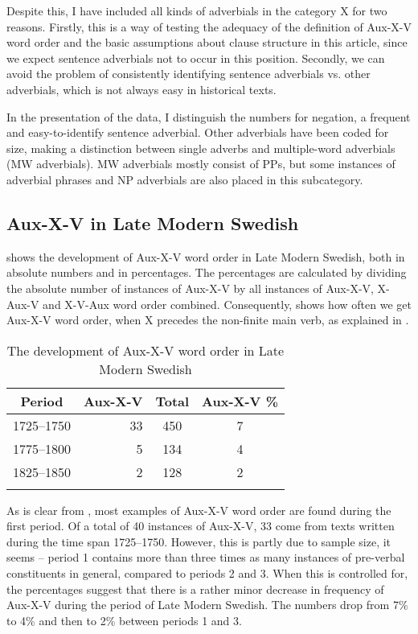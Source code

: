 \documentclass[output=paper, colorlinks, citecolor=brown]{langscibook}
\begin{document}
Despite this, I have included all kinds of adverbials in the category X for two reasons. Firstly, this is a way of testing the adequacy of the definition of Aux-X-V word order and the basic assumptions about clause structure in this article, since we expect sentence adverbials not to occur in this position. Secondly, we can avoid the problem of consistently identifying sentence adverbials vs. other adverbials, which is not always easy in historical texts.



In the presentation of the data, I distinguish the numbers for negation, a frequent and easy-to-identify sentence adverbial. Other adverbials have been coded for size, making a distinction between single adverbs and multiple-word adverbials (MW adverbials). MW adverbials mostly consist of PPs, but some instances of adverbial phrases and NP adverbials are also placed in this subcategory.


\subsection{Aux-X-V in Late Modern Swedish}\label{sec:sangfelt:4.2}

 shows the development of Aux-X-V word order in Late Modern Swedish, both in absolute numbers and in percentages. The percentages are calculated by dividing the absolute number of instances of Aux-X-V by all instances of Aux-X-V, X-Aux-V and X-V-Aux word order combined. Consequently,  shows how often we get Aux-X-V word order, when X precedes the non-finite main verb, as explained in .



\begin{table}
\caption{The development of Aux-X-V word order in Late Modern Swedish\label{tab:sangfelt:1}}
\begin{tabular}{crcc}
\lsptoprule
Period & {Aux-X-V} & Total & {Aux-X-V} \%\\
\midrule
1725–1750 & 33 & 450 & 7\\
1775–1800 & 5 & 134 & 4\\
1825–1850 & 2 & 128 & 2\\
\lspbottomrule
\end{tabular}
\end{table}

As is clear from , most examples of Aux-X-V word order are found during the first period. Of a total of 40 instances of Aux-X-V, 33 come from texts written during the time span 1725–1750. However, this is partly due to sample size, it seems – period 1 contains more than three times as many instances of pre-verbal constituents in general, compared to periods 2 and 3. When this is controlled for, the percentages suggest that there is a rather minor decrease in frequency of Aux-X-V during the period of Late Modern Swedish. The numbers drop from 7\% to 4\% and then to 2\% between periods 1 and 3.
\end{document}
